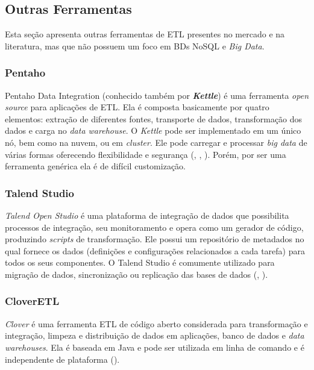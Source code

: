 \subsection{Outras Ferramentas}

Esta seção apresenta outras ferramentas de ETL presentes no mercado e na literatura, mas que não possuem um foco em BDs NoSQL e \textit{Big Data}.
\subsubsection{Pentaho}

Pentaho Data Integration (conhecido também por \textit{\textbf{Kettle}}) é uma ferramenta \textit{open source} para aplicações de ETL. Ela é composta basicamente por quatro elementos: extração de diferentes fontes, transporte de dados, transformação dos dados e carga no \textit{data warehouse}. O \textit{Kettle} pode ser implementado em um único nó, bem como na nuvem, ou em \textit{cluster}. Ele pode carregar e processar \textit{big data} de várias formas oferecendo flexibilidade e segurança (\cite{mali:2015}, \cite{ETLtools}, \cite{pentaho}). Porém, por ser uma ferramenta genérica ela é de difícil customização. 

\subsubsection{Talend Studio}

\textit{Talend Open Studio} é uma plataforma de integração de dados que possibilita processos de integração, seu monitoramento e opera como um gerador de código, produzindo \textit{scripts} de transformação. Ele possui um repositório de metadados no qual fornece os dados (definições e configurações relacionados a cada tarefa) para todos os seus componentes. O Talend Studio é comumente utilizado para migração de dados, sincronização ou replicação das bases de dados  (\cite{mali:2015}, \cite{ETLtools}). 

\subsubsection{CloverETL}

\textit{Clover} é uma ferramenta ETL de código aberto considerada para transformação e integração, limpeza e distribuição de dados em aplicações, banco de dados e \textit{data warehouses}. Ela é baseada em Java e pode ser utilizada em linha de comando e é independente de plataforma  (\cite{mali:2015}).

